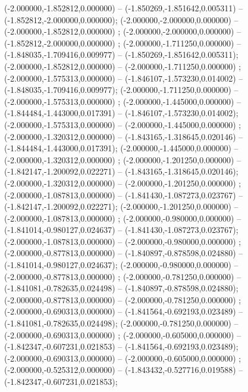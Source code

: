  (-2.000000,-1.852812,0.000000) -- (-1.850269,-1.851642,0.005311) -- (-1.852812,-2.000000,0.000000);
 (-2.000000,-2.000000,0.000000) -- (-2.000000,-1.852812,0.000000) ;
 (-2.000000,-2.000000,0.000000) -- (-1.852812,-2.000000,0.000000) ;
 (-2.000000,-1.711250,0.000000) -- (-1.848035,-1.709416,0.009977) -- (-1.850269,-1.851642,0.005311);
 (-2.000000,-1.852812,0.000000) -- (-2.000000,-1.711250,0.000000) ;
 (-2.000000,-1.575313,0.000000) -- (-1.846107,-1.573230,0.014002) -- (-1.848035,-1.709416,0.009977);
 (-2.000000,-1.711250,0.000000) -- (-2.000000,-1.575313,0.000000) ;
 (-2.000000,-1.445000,0.000000) -- (-1.844484,-1.443000,0.017391) -- (-1.846107,-1.573230,0.014002);
 (-2.000000,-1.575313,0.000000) -- (-2.000000,-1.445000,0.000000) ;
 (-2.000000,-1.320312,0.000000) -- (-1.843165,-1.318645,0.020146) -- (-1.844484,-1.443000,0.017391);
 (-2.000000,-1.445000,0.000000) -- (-2.000000,-1.320312,0.000000) ;
 (-2.000000,-1.201250,0.000000) -- (-1.842147,-1.200092,0.022271) -- (-1.843165,-1.318645,0.020146);
 (-2.000000,-1.320312,0.000000) -- (-2.000000,-1.201250,0.000000) ;
 (-2.000000,-1.087813,0.000000) -- (-1.841430,-1.087273,0.023767) -- (-1.842147,-1.200092,0.022271);
 (-2.000000,-1.201250,0.000000) -- (-2.000000,-1.087813,0.000000) ;
 (-2.000000,-0.980000,0.000000) -- (-1.841014,-0.980127,0.024637) -- (-1.841430,-1.087273,0.023767);
 (-2.000000,-1.087813,0.000000) -- (-2.000000,-0.980000,0.000000) ;
 (-2.000000,-0.877813,0.000000) -- (-1.840897,-0.878598,0.024880) -- (-1.841014,-0.980127,0.024637);
 (-2.000000,-0.980000,0.000000) -- (-2.000000,-0.877813,0.000000) ;
 (-2.000000,-0.781250,0.000000) -- (-1.841081,-0.782635,0.024498) -- (-1.840897,-0.878598,0.024880);
 (-2.000000,-0.877813,0.000000) -- (-2.000000,-0.781250,0.000000) ;
 (-2.000000,-0.690313,0.000000) -- (-1.841564,-0.692193,0.023489) -- (-1.841081,-0.782635,0.024498);
 (-2.000000,-0.781250,0.000000) -- (-2.000000,-0.690313,0.000000) ;
 (-2.000000,-0.605000,0.000000) -- (-1.842347,-0.607231,0.021853) -- (-1.841564,-0.692193,0.023489);
 (-2.000000,-0.690313,0.000000) -- (-2.000000,-0.605000,0.000000) ;
 (-2.000000,-0.525312,0.000000) -- (-1.843432,-0.527716,0.019588) -- (-1.842347,-0.607231,0.021853);
